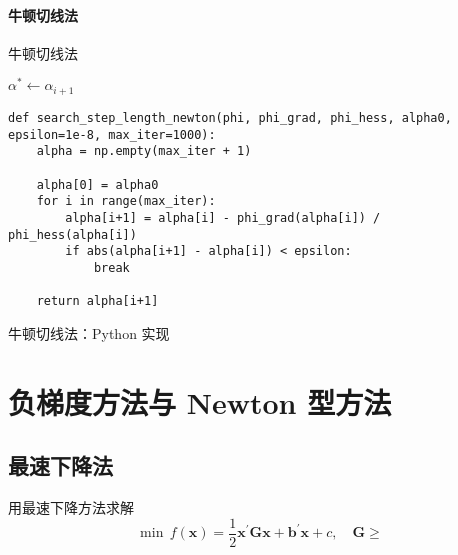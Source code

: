 \documentclass[cn,mtpro2,12pt]{elegantbook}
\begin{document}
\subsubsection{牛顿切线法}

\begin{algorithm}
    \caption{牛顿切线法}
    $\alpha^{*}\leftarrow\alpha_{i+1}$\;
\end{algorithm}

\begin{listing}
    \begin{verbatim}
def search_step_length_newton(phi, phi_grad, phi_hess, alpha0, epsilon=1e-8, max_iter=1000):
    alpha = np.empty(max_iter + 1)

    alpha[0] = alpha0
    for i in range(max_iter):
        alpha[i+1] = alpha[i] - phi_grad(alpha[i]) / phi_hess(alpha[i])
        if abs(alpha[i+1] - alpha[i]) < epsilon:
            break
    
    return alpha[i+1]
    \end{verbatim}
    \caption{牛顿切线法：Python 实现}
\end{listing}

\chapter{负梯度方法与 Newton 型方法}

\section{最速下降法}

\begin{example}
    用最速下降方法求解
    \begin{equation}
        \min\,f(\mathbf{x})=\frac{1}{2}\mathbf{x}^{\prime}\mathbf{G}\mathbf{x}+\mathbf{b}^{\prime}\mathbf{x}+c,\quad\mathbf{G}\ge
    \end{equation}
\end{example}
\end{document}
